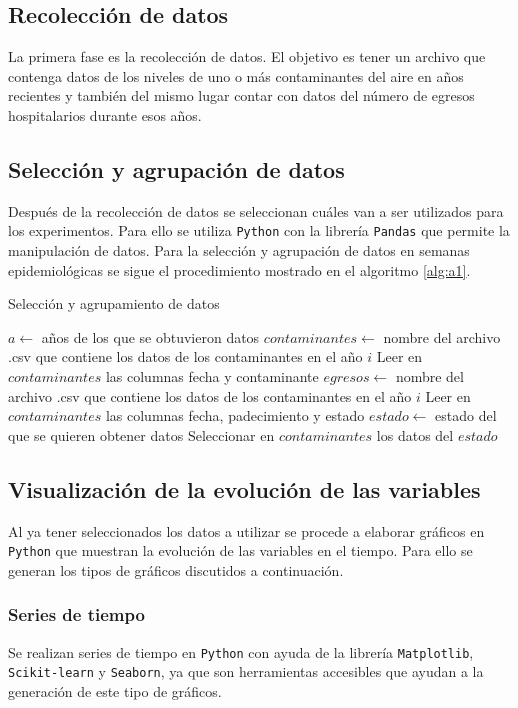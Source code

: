 \subsection{Recolección de datos}
La primera fase es la recolección de datos. El objetivo es tener un archivo que contenga datos de los niveles de uno o más contaminantes del aire en años recientes y también del mismo lugar contar con datos del número de egresos hospitalarios durante esos años.

\subsection{Selección y agrupación de datos}
Después de la recolección de datos se seleccionan cuáles van a ser utilizados para los experimentos. Para ello se utiliza \texttt{Python} con la librería \texttt{Pandas} que permite la manipulación de datos. Para la selección y agrupación de datos en semanas epidemiológicas se sigue el procedimiento mostrado en el algoritmo \ref{alg:a1}.

\begin{algorithm}
\caption{Selección y agrupamiento de datos}\label{alg:a1}
\begin{algorithmic}[1]
\State $a \leftarrow $ años de los que se obtuvieron datos
    \State $contaminantes \leftarrow $ nombre del archivo .csv que contiene los datos de los contaminantes en el año $i$
    \State Leer en $contaminantes$ las columnas fecha y contaminante 
    \State $egresos \leftarrow $ nombre del archivo .csv que contiene los datos de los contaminantes en el año $i$
    \State Leer en $contaminantes$ las columnas fecha, padecimiento y estado
    \State $estado \leftarrow $ estado del que se quieren obtener datos
    \State Seleccionar en $contaminantes$ los datos del $estado$
\EndFor
\end{algorithmic} 
\end{algorithm}

\subsection{Visualización de la evolución de las variables}
Al ya tener seleccionados los datos a utilizar se procede a elaborar gráficos en \texttt{Python} que muestran la evolución de las variables en el tiempo. Para ello se generan los tipos de gráficos discutidos a continuación.

\subsubsection{Series de tiempo}
Se realizan series de tiempo en \texttt{Python} con ayuda de la librería  \texttt{Matplotlib}, \texttt{Scikit-learn} y \texttt{Seaborn}, ya que son herramientas accesibles que ayudan a la generación de este tipo de gráficos. %

